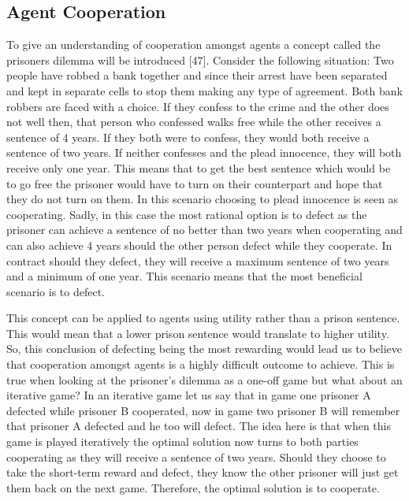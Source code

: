 \documentclass[oneside,12pt]{Classes/RoboticsLaTeX}
\begin{document}
\subsection{Agent Cooperation}
To give an understanding of cooperation amongst agents a concept called the prisoners dilemma will be introduced [47]. Consider the following situation: Two people have robbed a bank together and since their arrest have been separated and kept in separate cells to stop them making any type of agreement. Both bank robbers are faced with a choice. If they confess to the crime and the other does not well then, that person who confessed walks free while the other receives a sentence of 4 years. If they both were to confess, they would both receive a sentence of two years. If neither confesses and the plead innocence, they will both receive only one year. This means that to get the best sentence which would be to go free the prisoner would have to turn on their counterpart and hope that they do not turn on them. In this scenario choosing to plead innocence is seen as cooperating. Sadly, in this case the most rational option is to defect as the prisoner can achieve a sentence of no better than two years when cooperating and can also achieve 4 years should the other person defect while they cooperate. In contract should they defect, they will receive a maximum sentence of two years and a minimum of one year. This scenario means that the most beneficial scenario is to defect. 

This concept can be applied to agents using utility rather than a prison sentence. This would mean that a lower prison sentence would translate to higher utility. So, this conclusion of defecting being the most rewarding would lead us to believe that cooperation amongst agents is a highly difficult outcome to achieve. This is true when looking at the prisoner’s dilemma as a one-off game but what about an iterative game? In an iterative game let us say that in game one prisoner A defected while prisoner B cooperated, now in game two prisoner B will remember that prisoner A defected and he too will defect. The idea here is that when this game is played iteratively the optimal solution now turns to both parties cooperating as they will receive a sentence of two years. Should they choose to take the short-term reward and defect, they know the other prisoner will just get them back on the next game. Therefore, the optimal solution is to cooperate.  
 
\end{document}
